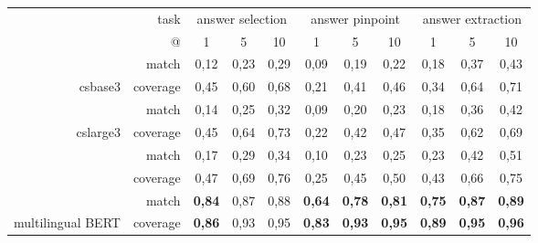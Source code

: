 \documentclass[
  printed, %
  color,   %
  table,   %
  oneside, %
  lof,     %
  lot,     %
]{fithesis3}
\begin{document}
\begin{table}[h]
\centering
\small
\begin{adjustbox}{center}
\begin{tabular}{rr|c|c|c|c|c|c|c|c|c}
    
        & task & \multicolumn{3}{c|}{answer selection} & \multicolumn{3}{c|}{answer pinpoint} & \multicolumn{3}{c}{answer extraction} \\
        

        & @ & 1 & 5 & 10 & 1 & 5 & 10 & 1 & 5 & 10 \\
    \toprule
        \cellcolor{thesis@color@tableOdd} & match &
            0,12 & 0,23 & 0,29 & 0,09 & 0,19 & 0,22 & 0,18 & 0,37 & 0,43 \\
        \multirow{-2}{*}{\cellcolor{thesis@color@tableOdd}csbase3}    & coverage &
            0,45 & 0,60 & 0,68 & 0,21 & 0,41 & 0,46 & 0,34 & 0,64 & 0,71 \\
        
        \cellcolor{thesis@color@tableEven} & match &
            0,14 & 0,25 & 0,32 & 0,09 & 0,20 & 0,23 & 0,18 & 0,36 & 0,42 \\
        \multirow{-2}{*}{\cellcolor{thesis@color@tableEven}cslarge3}    & coverage & 
            0,45 & 0,64 & 0,73 & 0,22 & 0,42 & 0,47 & 0,35 & 0,62 & 0,69 \\
        
        \cellcolor{thesis@color@tableOdd} & match & 
            0,17 & 0,29 & 0,34 & 0,10 & 0,23 & 0,25 & 0,23 & 0,42 & 0,51 \\
        \cellcolor{thesis@color@tableOdd}\multirow{-2}{*}{csbase4} & coverage &
            0,47 & 0,69 & 0,76 & 0,25 & 0,45 & 0,50 & 0,43 & 0,66 & 0,75 \\
        
        \cellcolor{thesis@color@tableEven} & match &
            \textbf{0,84} & 0,87 & 0,88 & \textbf{0,64} & \textbf{0,78} & \textbf{0,81} & \textbf{0,75} & \textbf{0,87} & \textbf{0,89}  \\
        \multirow{-2}{*}{\cellcolor{thesis@color@tableEven}multilingual BERT}  & coverage &
            \textbf{0,86} & 0,93 & 0,95 & \textbf{0,83} & \textbf{0,93} & \textbf{0,95} & \textbf{0,89} & \textbf{0,95} & \textbf{0,96}  \\
        

\end{tabular}
\end{adjustbox}
\end{table}
\end{document}
